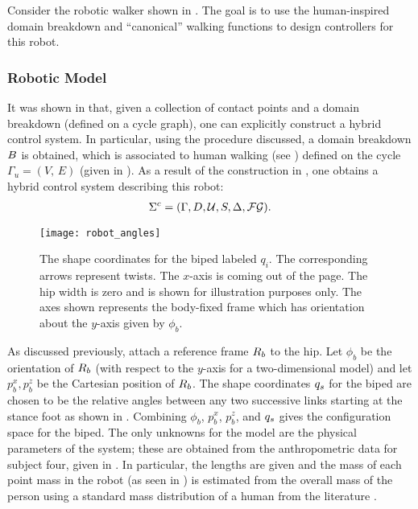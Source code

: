 Consider the robotic walker shown in .
%
The goal is to use the human-inspired domain breakdown and ``canonical'' walking
functions to design controllers for this robot.


\subsubsection{Robotic Model}

It was shown in  that, given a collection of contact
points and a domain breakdown (defined on a cycle graph), one can explicitly
construct a hybrid control system.
%
In particular, using the procedure discussed, a domain breakdown $B$ is
obtained, which is associated to human walking (see
) defined on the cycle $\Gamma_u = (V, \, E)$ (given
in ).
%
As a result of the construction in , one obtains a
hybrid control system describing this robot:
%
\begin{align}
  \label{eq:hcstime}
  \Sigma^{c} = (\Gamma, D, \mathcal{U}, S, \Delta, \mathcal{FG}).
\end{align}
%
\begin{figure}[t!]
  \centering
  \texttt{[image: robot\_angles]}
  \caption[The shape coordinates for the biped labeled $q_i$.]{The shape
    coordinates for the biped labeled $q_i$.
    The corresponding arrows represent twists. The $x$-axis is coming out of the
    page.
    The hip width is zero and is shown for illustration purposes only.
    The axes shown represents the body-fixed frame which has orientation about
    the $y$-axis given by $\phi_b$.}
  \label{fig:shapecoords}
\end{figure}
%
As discussed previously, attach a reference frame $R_{b}$ to the hip. Let $\phi_b$
be the orientation of $R_{b}$ (with respect to the $y$-axis for a two-dimensional
model) and let $p_b^x, p_b^z$ be the Cartesian position of $R_{b}$.
%
The shape coordinates $q_{s}$ for the biped are chosen to be the relative angles
between any two successive links starting at the stance foot as shown in
.
%
Combining $\phi_b$, $p_b^x$, $p_b^z$, and $q_{s}$ gives the configuration space
for the biped.
%
The only unknowns for the model are the physical parameters of the system;
%
these are obtained from the anthropometric data for subject four, given in
.
%
In particular, the lengths are given and the mass of each point mass in the
robot (as seen in ) is estimated from the overall
mass of the person using a standard mass distribution of a human from the
literature \cite{Winter2009}.


